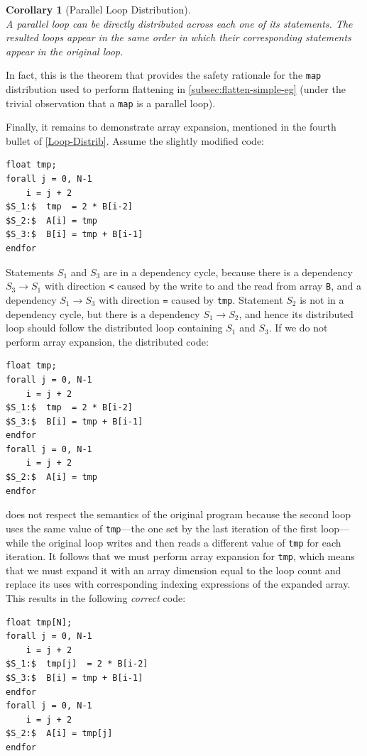 \documentclass[acmsmall,review]{acmart}\settopmatter{printfolios=true,printccs=false,printacmref=false}
\newtheorem{mycorol}{Corollary}
\begin{document}
\begin{mycorol}[Parallel Loop Distribution]\label{Par-Loop-Distr}
$\mbox{ }$\\
A parallel loop can be directly distributed across each one of
its statements. The resulted loops appear in the same order in 
which their corresponding statements appear in the original loop.
\end{mycorol}

In fact, this is the theorem that provides the safety rationale
for the \lstinline{map} distribution used to perform flattening
in  \cref{subsec:flatten-simple-eg} (under the trivial observation
that a \lstinline{map} is a parallel loop).

Finally, it remains to demonstrate array expansion, mentioned
in the fourth bullet of \cref{Loop-Distrib}. Assume the slightly
modified code:
\begin{lstlisting}[mathescape=true]
float tmp;
forall j = 0, N-1
    i = j + 2
$S_1:$  tmp  = 2 * B[i-2]
$S_2:$  A[i] = tmp
$S_3:$  B[i] = tmp + B[i-1]
endfor
\end{lstlisting}\vspace{-2ex}
Statements $S_1$ and $S_3$ are in a dependency cycle, because
there is a dependency $S_3\to S_1$ with direction {\tt<} caused
by the write to and the read from array {\tt B}, and a dependency 
$S_1\to S_3$ with direction {\tt=} caused by {\tt tmp}.
Statement $S_2$ is not in a dependency cycle, but there is a
dependency $S_1\to S_2$, and hence its distributed loop
should follow the distributed loop containing $S_1$ and $S_3$. 
If we do not perform array expansion, the distributed code:

\begin{lstlisting}[mathescape=true]
float tmp;
forall j = 0, N-1
    i = j + 2
$S_1:$  tmp  = 2 * B[i-2]
$S_3:$  B[i] = tmp + B[i-1]
endfor
forall j = 0, N-1
    i = j + 2
$S_2:$  A[i] = tmp
endfor
\end{lstlisting}\vspace{-2ex}
\noindent does not respect the semantics of the original program
because the second loop uses the same value of {\tt tmp}---the one
set by the last iteration of the first loop---while the original
loop writes and then reads a different value of {\tt tmp} for 
each iteration. It follows that we must perform array expansion
for {\tt tmp}, which means that we must expand it with an array 
dimension equal to the loop count and replace its uses with
corresponding indexing expressions of the expanded array. 
This results in the following {\em correct} code:
\begin{lstlisting}[mathescape=true]
float tmp[N];
forall j = 0, N-1
    i = j + 2
$S_1:$  tmp[j]  = 2 * B[i-2]
$S_3:$  B[i] = tmp + B[i-1]
endfor
forall j = 0, N-1
    i = j + 2
$S_2:$  A[i] = tmp[j]
endfor
\end{lstlisting}\vspace{-2ex}
\end{document}
